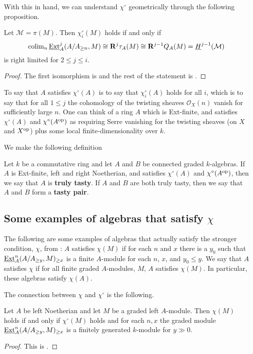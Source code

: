 \documentclass[reqno, 12pt]{amsart}
\begin{document}
With this in hand, we can understand $\chi^\circ$ geometrically through the following proposition.
\begin{proposition}
  Let $\mathcal{M} = \pi(M)$.
  Then $\chi_i^\circ(M)$ holds if and only if
  $$\operatorname{colim}_n \underline{\operatorname{Ext}}^j_A(A/A_{\geq n}, M) \cong \mathbf{R}^j\tau_A(M) \cong \mathbf{R}^{j-1}Q_A (M) = \underline{H}^{j-1}(\mathcal{M})$$
  is right limited for $2 \leq j \leq i$.
\end{proposition}
\begin{proof}
  The first isomorphism is \cite[Lem. 4.1.2]{VdB} and the rest of the statement is \cite[Cor. 3.6 (3)]{AZ}.
\end{proof}
To say that $A$ satisfies $\chi^\circ(A)$ is to say that $\chi_i^\circ(A)$ holds for all $i$, which is to say that for all $1 \leq j$ the cohomology of the twisting sheaves $\mathcal{O}_X(n)$ vanish for sufficiently large $n$.
One can think of a ring $A$ which is Ext-finite, and satisfies $\chi^\circ(A)$ and $\chi^\circ(A^{\operatorname{op}})$ as requiring Serre vanishing for the twisting sheaves (on $X$ and $X^{\operatorname{op}}$) plus some local finite-dimensionality over $k$.

We make the following definition
\begin{definition}
  Let $k$ be a commutative ring and let $A$ and $B$ be connected graded $k$-algebras.
  If $A$ is Ext-finite, left and right Noetherian, and satisfies $\chi^\circ(A)$ and $\chi^\circ(A^{\operatorname{op}})$, then we say that $A$ is \textbf{truly tasty}.
  If $A$ and $B$ are both truly tasty, then we say that $A$ and $B$ form a \textbf{tasty pair}.
\end{definition}

\subsection{Some examples of algebras that satisfy $\chi$}
The following are some examples of algebras that actually satisfy the stronger condition, $\chi$, from \cite{AZ}:
$A$ satisfies $\chi(M)$ if for each $n$ and $x$ there is a $y_0$ such that $\underline{\operatorname{Ext}}^n_A(A/A_{\geq y},M)_{\geq x}$ is a finite $A$-module for each $n$, $x$, and $y_0 \leq y$.
We say that $A$ satisfies $\chi$ if for all finite graded $A$-modules, $M$, $A$ satisfies $\chi(M)$.
In particular, these algebras satisfy $\chi(A)$.

The connection between $\chi$ and $\chi^\circ$ is the following.

\begin{proposition}
  Let $A$ be left Noetherian and let $M$ be a graded left $A$-module. Then $\chi(M)$ holds if and only if $\chi^\circ(M)$ holds and for each $n,x$ the graded module $\underline{\operatorname{Ext}}_A^n(A/A_{\geq y},M)_{\geq x}$ is a finitely generated $k$-module for $y \gg 0$.
\end{proposition}
\begin{proof}
  This is \cite[Prop 3.8 (1)]{AZ}.
\end{proof}
\end{document}
